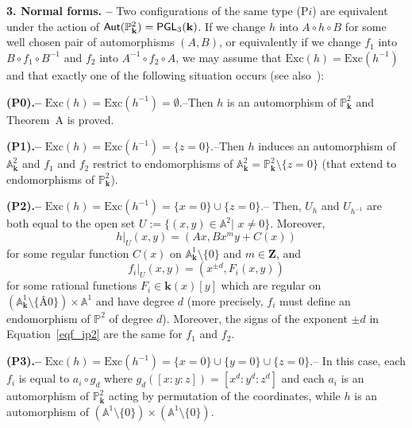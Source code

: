 \documentclass[reqno,oneside,12pt]{amsart}
\theoremstyle{plain}
\theoremstyle{definition}
\def\Z{\mathbf{Z}}
\def\bfk{{\mathbf{k}}}
\newcommand{\bbA}{{\mathbb{A}}}
\def\P{\mathbb{P}}
\def\Aut{{\sf{Aut}}}
\def\PGL{{\sf{PGL}}}
\def\Exc{{\text{Exc}}}
\begin{document}
\medskip

{\noindent}{\bf{3. Normal forms. --}}
Two configurations of the same type (P$i$) are equivalent under the action of $\Aut(\P^2_\bfk)=\PGL_3(\bfk)$. 
If we change $h$ into $A\circ h\circ B$ for some well chosen pair of automorphisms $(A,B)$, or equivalently if we change $f_1$ into $B\circ f_1\circ B^{-1}$ and 
$f_2$ into $A^{-1}\circ f_2\circ A$, we may assume that $\Exc(h)=\Exc(h^{-1})$ and that exactly  one of the following situation occurs (see also~\cite{Fornaess-Sibony}):

\smallskip

{{\bf{(P0).--}} {$\Exc(h)=\Exc(h^{-1})=\emptyset$.--}\indent Then $h$ is an automorphism of $\P^2_\bfk$ and Theorem~A is proved. 

\smallskip

{{\bf{(P1).--}} {$\Exc(h)=\Exc(h^{-1})=\{z=0\}$.--}\indent  Then $h$ induces an automorphism of $\bbA^2_\bfk$ and
$f_1$ and $f_2$ restrict to endomorphisms of $\bbA^2_\bfk=\P^2_\bfk\setminus \{z=0\}$ (that extend to endomorphisms of $\P^2_\bfk$).

\smallskip

{{\bf{(P2).--}} {$\Exc(h)=\Exc(h^{-1})=\{x=0\}\cup \{z=0\}$.--}\indent  
Then, 
$U_h$ and $U_{h^{-1}}$ are both equal to the open set $U:=\{(x,y)\in \bbA^2|\,\, x\neq 0\}$. Moreover,
\begin{equation}\label{eq:h-jonq}
h|_U(x,y) = (Ax, Bx^{m}y+C(x))
\end{equation}
for some regular function $C(x)$ on $\bbA^1_\bfk\setminus\{ 0\}$ and $m\in \Z$, and 
\begin{equation}\label{eqf_ip2}
f_i|_U(x,y)= (x^{\pm d}, F_i(x,y))
\end{equation} 
for some rational functions $F_i\in \bfk(x)[y]$ which are regular on $(\bbA^1_\bfk\setminus\{Â 0\})\times \bbA^1$
and have degree $d$ (more precisely, $f_i$ must define an endomorphism of $\P^2$ of degree $d$).
Moreover, the signs of the exponent $\pm d$ in Equation~\eqref{eqf_ip2} are the same for $f_1$ and $f_2$.

\smallskip

{{\bf{(P3).--}} {$\Exc(h)=\Exc(h^{-1})=\{x=0\}\cup\{y=0\}\cup \{z=0\}$.--}\indent  
In this case, 
each $f_i$ is equal to $a_i\circ g_d$ where  $g_d( [x:y:z])= [x^d:y^d:z^d]$
and each $a_i$  is an automorphism of $\P^2_\bfk$ acting by permutation of the coordinates, while 
$h$ is an automorphism of $(\bbA^1\setminus \{0\})\times (\bbA^1\setminus \{0\})$.






}}}}
\end{document}
